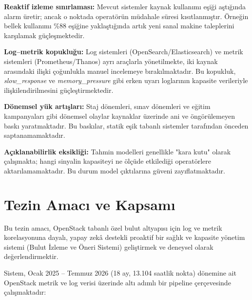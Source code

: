 \begin{maddelendir}[label=\arabic*.]
    \item \textbf{Reaktif izleme sınırlaması:}
    Mevcut sistemler kaynak kullanımı eşiği aştığında alarm üretir; ancak o noktada operatörün müdahale süresi kısıtlanmıştır.
    Örneğin bellek kullanımı \%88 eşiğine yaklaştığında artık yeni sanal makine taleplerini karşılamak güçleşmektedir.

    \item \textbf{Log–metrik kopukluğu:}
    Log sistemleri (OpenSearch/Elasticsearch) ve metrik sistemleri (Prometheus/Thanos) ayrı araçlarla yönetilmekte, iki kaynak arasındaki ilişki çoğunlukla manuel incelemeye bırakılmaktadır.
    Bu kopukluk, \textit{slow\_response} ve \textit{memory\_pressure} gibi erken uyarı loglarının kapasite verileriyle ilişkilendirilmesini güçleştirmektedir.

    \item \textbf{Dönemsel yük artışları:}
    Staj dönemleri, sınav dönemleri ve eğitim kampanyaları gibi dönemsel olaylar kaynaklar üzerinde ani ve öngörülemeyen baskı yaratmaktadır.
    Bu baskılar, statik eşik tabanlı sistemler tarafından önceden saptanamamaktadır.

    \item \textbf{Açıklanabilirlik eksikliği:}
    Tahmin modelleri genellikle "kara kutu" olarak çalışmakta; hangi sinyalin kapasiteyi ne ölçüde etkilediği operatörlere aktarılamamaktadır.
    Bu durum model çıktılarına güveni zayıflatmaktadır.
\end{maddelendir}


\section{Tezin Amacı ve Kapsamı}

Bu tezin amacı, OpenStack tabanlı özel bulut altyapısı için log ve metrik korelasyonuna dayalı, yapay zekâ destekli proaktif bir sağlık ve kapasite yönetim sistemi (Bulut İzleme ve Öneri Sistemi) geliştirmek ve deneysel olarak değerlendirmektir.

Sistem, Ocak 2025 -- Temmuz 2026 (18 ay, 13.104 saatlik nokta) dönemine ait OpenStack metrik ve log verisi üzerinde altı adımlı bir pipeline çerçevesinde çalışmaktadır:

